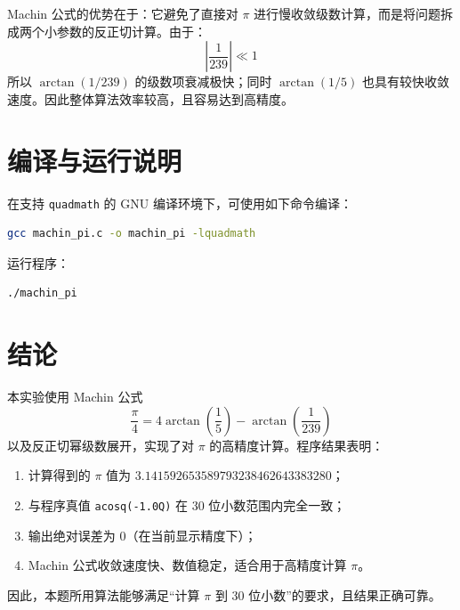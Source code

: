 \documentclass[12pt,a4paper]{article}
\begin{document}
Machin 公式的优势在于：它避免了直接对 $\pi$ 进行慢收敛级数计算，而是将问题拆成两个小参数的反正切计算。由于：
\[
\left|\frac{1}{239}\right| \ll 1
\]
所以 $\arctan(1/239)$ 的级数项衰减极快；同时 $\arctan(1/5)$ 也具有较快收敛速度。因此整体算法效率较高，且容易达到高精度。

\section{编译与运行说明}

在支持 \texttt{quadmath} 的 GNU 编译环境下，可使用如下命令编译：

\begin{lstlisting}[language=bash]
gcc machin_pi.c -o machin_pi -lquadmath
\end{lstlisting}

运行程序：

\begin{lstlisting}[language=bash]
./machin_pi
\end{lstlisting}

\section{结论}

本实验使用 Machin 公式
\[
\frac{\pi}{4}=4\arctan\left(\frac{1}{5}\right)-\arctan\left(\frac{1}{239}\right)
\]
以及反正切幂级数展开，实现了对 $\pi$ 的高精度计算。程序结果表明：

\begin{enumerate}[label=\arabic*)]
    \item 计算得到的 $\pi$ 值为 $3.141592653589793238462643383280$；
    \item 与程序真值 \texttt{acosq(-1.0Q)} 在 30 位小数范围内完全一致；
    \item 输出绝对误差为 0（在当前显示精度下）；
    \item Machin 公式收敛速度快、数值稳定，适合用于高精度计算 $\pi$。
\end{enumerate}

因此，本题所用算法能够满足“计算 $\pi$ 到 30 位小数”的要求，且结果正确可靠。
\end{document}
